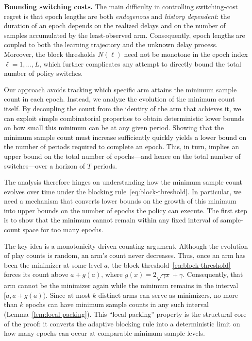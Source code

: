 \documentclass[opre,blindrev]{informs3}
\begin{document}
\begin{APPENDICES}
{\bf Bounding switching costs.}
The main difficulty in controlling switching-cost regret is that epoch lengths are both \emph{endogenous} and \emph{history dependent}: the duration of an epoch depends on the realized delays and on the number of samples accumulated by the least-observed arm. Consequently, epoch lengths are coupled to both the learning trajectory and the unknown delay process. Moreover, the block thresholds \(N(\ell)\) need not be monotone in the epoch index \(\ell=1,\dots,L\), which further complicates any attempt to directly bound the total number of policy switches.

Our approach avoids tracking which specific arm attains the minimum sample count in each epoch. Instead, we analyze the evolution of the minimum count itself. By decoupling the count from the identity of the arm that achieves it, we can exploit simple combinatorial properties to obtain deterministic lower bounds on how small this minimum can be at any given period. Showing that the minimum sample count must increase sufficiently quickly yields a lower bound on the number of periods required to complete an epoch. This, in turn, implies an upper bound on the total number of epochs---and hence on the total number of switches---over a horizon of \(T\) periods.

The analysis therefore hinges on understanding how the minimum sample count evolves over time under the blocking rule~\eqref{eq:block-threshold}. In particular, we need a mechanism that converts lower bounds on the growth of this minimum into upper bounds on the number of epochs the policy can execute. The first step is to show that the minimum cannot remain within any fixed interval of sample-count space for too many epochs.

The key idea is a monotonicity-driven counting argument. Although the evolution of play counts is random, an arm's count never decreases. Thus, once an arm has been the minimizer at some level \(a\), the block threshold~\eqref{eq:block-threshold} forces its count above \(a+g(a)\), where \(g(x)=2\sqrt{\gamma x}+\gamma\). Consequently, that arm cannot be the minimizer again while the minimum remains in the interval \([a, a+g(a))\). Since at most \(k\) distinct arms can serve as minimizers, no more than \(k\) epochs can have minimum sample counts in any such interval (Lemma~\ref{lem:local-packing}). This ``local packing'' property is the structural core of the proof: it converts the adaptive blocking rule into a deterministic limit on how many epochs can occur at comparable minimum sample levels.


\end{APPENDICES}
\end{document}
